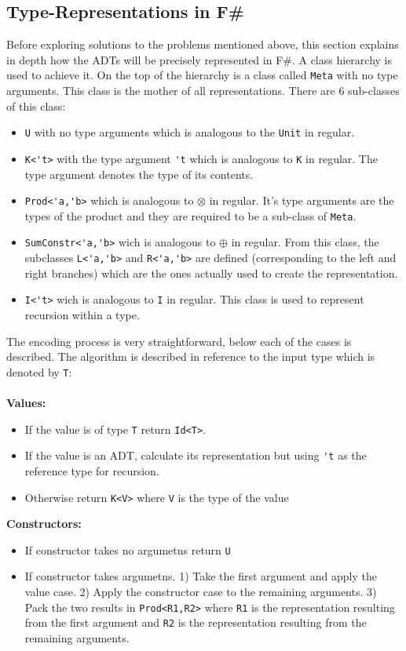 \documentclass[8pt]{extarticle}
\begin{document}
\subsection{Type-Representations in F\#}
Before exploring solutions to the problems mentioned above, this section explains in depth how the ADTs will be precisely represented in F\#. A class hierarchy is used to achieve it. On the top of the hierarchy is a class called \verb+Meta+ with no type arguments. This class is the mother of all representations. There are 6 sub-classes of this class:
\begin{itemize}
  \item \verb+U+ with no type arguments which is analogous to the \verb+Unit+ in regular.
  \item \verb+K<'t>+ with the type argument \verb+'t+ which is analogous to \verb+K+ in regular. The type argument denotes the type of its contents.
  \item \verb+Prod<'a,'b>+ which is analogous to $\otimes$ in regular. It's type arguments are the types of the product and they are required to be a sub-class of \verb+Meta+.
  \item \verb+SumConstr<'a,'b>+ wich is analogous to $\oplus$ in regular. From this class, the subclasses \verb+L<'a,'b>+ and \verb+R<'a,'b>+ are defined (corresponding to the left and right branches) which are the ones actually used to create the representation.
  \item \verb+I<'t>+ wich is analogous to \verb+I+ in regular. This class is used to represent recursion within a type.
\end{itemize}
\[
\]
The encoding process is very straightforward, below each of the cases is described. The algorithm is described in reference to the input type which is denoted by \verb+T+:
\\\\{\bf Values:}
\begin{itemize}
\item If the value is of type \verb+T+ return \verb+Id<T>+.
\item If the value is an ADT, calculate its representation but using \verb+'t+ as the reference type for recursion.
\item Otherwise return \verb+K<V>+ where \verb+V+ is the type of the value
\end{itemize}
{\bf Constructors:}
\begin{itemize}
\item If constructor takes no argumetns return \verb+U+
\item If constructor takes argumetns. 1) Take the first argument and apply the value case. 2) Apply the constructor case to the remaining arguments. 3) Pack the two results in \verb+Prod<R1,R2>+ where \verb+R1+ is the representation resulting from the first argument and \verb+R2+ is the representation resulting from the remaining arguments.
\end{itemize}
\end{document}
